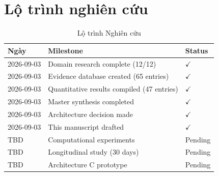 \section{Lộ trình nghiên cứu}

\begin{table}[H]
\centering
\caption{Lộ trình Nghiên cứu}
\label{tab:timeline}
\begin{tabular}{lll}
\toprule
\textbf{Ngày} & \textbf{Milestone} & \textbf{Status} \\
\midrule
2026-09-03 & Domain research complete (12/12) & $\checkmark$ \\
2026-09-03 & Evidence database created (65 entries) & $\checkmark$ \\
2026-09-03 & Quantitative results compiled (47 entries) & $\checkmark$ \\
2026-09-03 & Master synthesis completed & $\checkmark$ \\
2026-09-03 & Architecture decision made & $\checkmark$ \\
2026-09-03 & This manuscript drafted & $\checkmark$ \\
TBD & Computational experiments & Pending \\
TBD & Longitudinal study (30 days) & Pending \\
TBD & Architecture C prototype & Pending \\
\bottomrule
\end{tabular}
\end{table}
